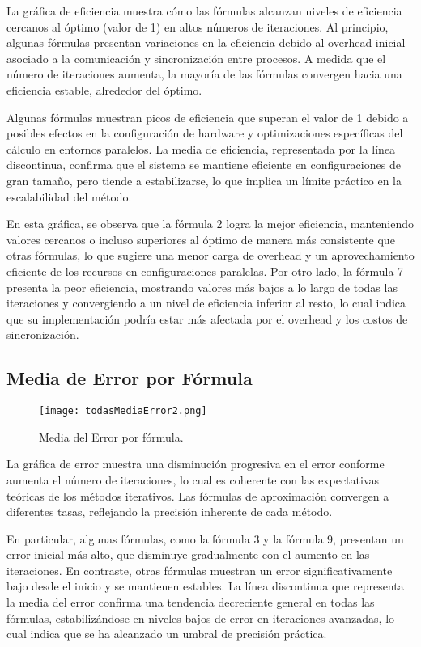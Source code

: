 \documentclass[conference, a4paper]{IEEEtran}
\begin{document}
La gráfica de eficiencia muestra cómo las fórmulas alcanzan niveles de eficiencia cercanos al óptimo (valor de 1) en altos números de iteraciones. Al principio, algunas fórmulas presentan variaciones en la eficiencia debido al overhead inicial asociado a la comunicación y sincronización entre procesos. A medida que el número de iteraciones aumenta, la mayoría de las fórmulas convergen hacia una eficiencia estable, alrededor del óptimo.

Algunas fórmulas muestran picos de eficiencia que superan el valor de 1 debido a posibles efectos en la configuración de hardware y optimizaciones específicas del cálculo en entornos paralelos. La media de eficiencia, representada por la línea discontinua, confirma que el sistema se mantiene eficiente en configuraciones de gran tamaño, pero tiende a estabilizarse, lo que implica un límite práctico en la escalabilidad del método.

En esta gráfica, se observa que la fórmula 2 logra la mejor eficiencia, manteniendo valores cercanos o incluso superiores al óptimo de manera más consistente que otras fórmulas, lo que sugiere una menor carga de overhead y un aprovechamiento eficiente de los recursos en configuraciones paralelas. Por otro lado, la fórmula 7 presenta la peor eficiencia, mostrando valores más bajos a lo largo de todas las iteraciones y convergiendo a un nivel de eficiencia inferior al resto, lo cual indica que su implementación podría estar más afectada por el overhead y los costos de sincronización.

\subsection{Media de Error por Fórmula}

\begin{figure}[h!]
    \centering
    \texttt{[image: todasMediaError2.png]}
    \caption{Media del Error por fórmula.}
    \label{fig:mediaError}
\end{figure}

La gráfica de error muestra una disminución progresiva en el error conforme aumenta el número de iteraciones, lo cual es coherente con las expectativas teóricas de los métodos iterativos. Las fórmulas de aproximación convergen a diferentes tasas, reflejando la precisión inherente de cada método.

En particular, algunas fórmulas, como la fórmula 3 y la fórmula 9, presentan un error inicial más alto, que disminuye gradualmente con el aumento en las iteraciones. En contraste, otras fórmulas muestran un error significativamente bajo desde el inicio y se mantienen estables. La línea discontinua que representa la media del error confirma una tendencia decreciente general en todas las fórmulas, estabilizándose en niveles bajos de error en iteraciones avanzadas, lo cual indica que se ha alcanzado un umbral de precisión práctica.
\end{document}
